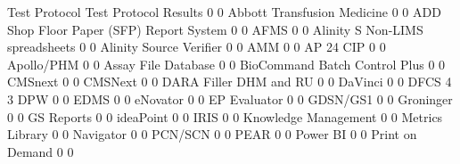\documentclass{article}
\begin{document}
\begin{Schunk}
\begin{Soutput}
                                           Test Protocol Test Protocol Results
                                                       0                     0
  Abbott Transfusion Medicine                          0                     0
  ADD Shop Floor Paper (SFP) Report System             0                     0
  AFMS                                                 0                     0
  Alinity S Non-LIMS spreadsheets                      0                     0
  Alinity Source Verifier                              0                     0
  AMM                                                  0                     0
  AP 24 CIP                                            0                     0
  Apollo/PHM                                           0                     0
  Assay File Database                                  0                     0
  BioCommand Batch Control Plus                        0                     0
  CMSnext                                              0                     0
  CMSNext                                              0                     0
  DARA Filler DHM and RU                               0                     0
  DaVinci                                              0                     0
  DFCS                                                 4                     3
  DPW                                                  0                     0
  EDMS                                                 0                     0
  eNovator                                             0                     0
  EP Evaluator                                         0                     0
  GDSN/GS1                                             0                     0
  Groninger                                            0                     0
  GS Reports                                           0                     0
  ideaPoint                                            0                     0
  IRIS                                                 0                     0
  Knowledge Management                                 0                     0
  Metrics Library                                      0                     0
  Navigator                                            0                     0
  PCN/SCN                                              0                     0
  PEAR                                                 0                     0
  Power BI                                             0                     0
  Print on Demand                                      0                     0

\end{Soutput}
\end{Schunk}
\end{document}
